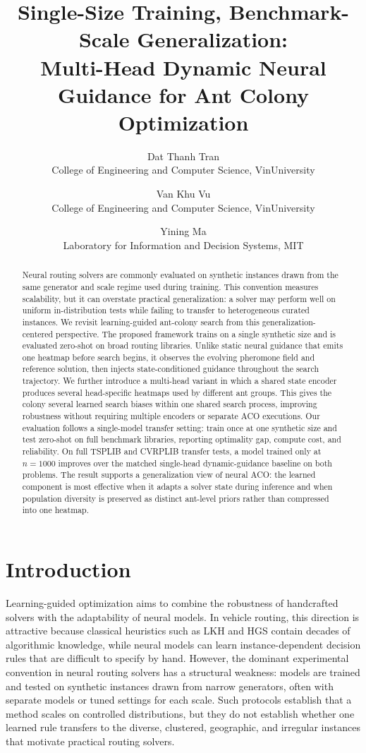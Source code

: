 \documentclass[11pt]{article}
\title{Single-Size Training, Benchmark-Scale Generalization:\\
Multi-Head Dynamic Neural Guidance for Ant Colony Optimization}
\author{
Dat Thanh Tran\\
College of Engineering and Computer Science, VinUniversity
\and
Van Khu Vu\\
College of Engineering and Computer Science, VinUniversity
\and
Yining Ma\\
Laboratory for Information and Decision Systems, MIT
}
\date{}
\begin{document}
\maketitle

\begin{abstract}
Neural routing solvers are commonly evaluated on synthetic instances drawn from the same generator and scale regime used during training.
This convention measures scalability, but it can overstate practical generalization: a solver may perform well on uniform in-distribution tests while failing to transfer to heterogeneous curated instances.
We revisit learning-guided ant-colony search from this generalization-centered perspective.
The proposed framework trains on a single synthetic size and is evaluated zero-shot on broad routing libraries.
Unlike static neural guidance that emits one heatmap before search begins, it observes the evolving pheromone field and reference solution, then injects state-conditioned guidance throughout the search trajectory.
We further introduce a multi-head variant in which a shared state encoder produces several head-specific heatmaps used by different ant groups.
This gives the colony several learned search biases within one shared search process, improving robustness without requiring multiple encoders or separate ACO executions.
Our evaluation follows a single-model transfer setting: train once at one synthetic size and test zero-shot on full benchmark libraries, reporting optimality gap, compute cost, and reliability.
On full TSPLIB and CVRPLIB transfer tests, a model trained only at $n=1000$ improves over the matched single-head dynamic-guidance baseline on both problems.
The result supports a generalization view of neural ACO: the learned component is most effective when it adapts a solver state during inference and when population diversity is preserved as distinct ant-level priors rather than compressed into one heatmap.
\end{abstract}

\section{Introduction}
\label{sec:intro}

Learning-guided optimization aims to combine the robustness of handcrafted solvers with the adaptability of neural models.
In vehicle routing, this direction is attractive because classical heuristics such as LKH and HGS contain decades of algorithmic knowledge, while neural models can learn instance-dependent decision rules that are difficult to specify by hand.
However, the dominant experimental convention in neural routing solvers has a structural weakness: models are trained and tested on synthetic instances drawn from narrow generators, often with separate models or tuned settings for each scale.
Such protocols establish that a method scales on controlled distributions, but they do not establish whether one learned rule transfers to the diverse, clustered, geographic, and irregular instances that motivate practical routing solvers.
\end{document}
